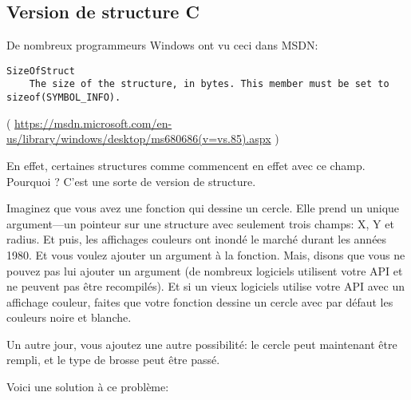 \subsection{Version de structure C}

De nombreux programmeurs Windows ont vu ceci dans MSDN:

\begin{lstlisting}
SizeOfStruct
    The size of the structure, in bytes. This member must be set to sizeof(SYMBOL_INFO).
\end{lstlisting}

( \url{https://msdn.microsoft.com/en-us/library/windows/desktop/ms680686(v=vs.85).aspx} )

En effet, certaines structures comme  commencent en effet avec ce
champ.  Pourquoi ?
C'est une sorte de version de structure.

Imaginez que vous avez une fonction qui dessine un cercle.
Elle prend un unique argument---un pointeur sur une structure avec seulement trois
champs: X, Y et radius.
Et puis, les affichages couleurs ont inondé le marché durant les années 1980. Et
vous voulez ajouter un argument  à la fonction.
Mais, disons que vous ne pouvez pas lui ajouter un argument (de nombreux logiciels
utilisent votre \ac{API} et ne peuvent pas être recompilés).
Et si un vieux logiciels utilise votre \ac{API} avec un affichage couleur, faites
que votre fonction dessine un cercle avec par défaut les couleurs noire et blanche.

Un autre jour, vous ajoutez une autre possibilité: le cercle peut maintenant être
rempli, et le type de brosse peut être passé.

Voici une solution à ce problème:

